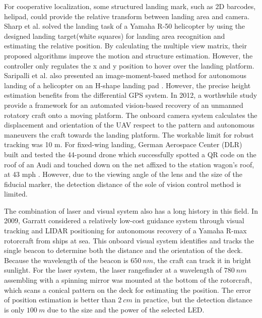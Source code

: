 For cooperative localization, some structured landing mark, such as 2D barcodes, helipad, could provide the relative transform between landing area and camera. Sharp et al. \cite{Sharp2001} solved the landing task of a Yamaha R-50 helicopter by using the designed landing target(white squares) for landing area recognition and estimating the relative position. By calculating the multiple view matrix, their proposed algorithms\cite{Shakernia2002} improve the motion and structure estimation. However, the controller only regulates the x and y position to hover over the landing platform. Saripalli et al. also presented an image-moment-based method for autonomous landing of a helicopter on an H-shape landing pad \cite{Saripalli2003}. However, the precise height estimation benefits from the differential GPS system. In 2012, a worthwhile study \cite{richardsonautomated2013} provide a framework for an automated vision-based recovery of an unmanned rotatory craft onto a moving platform. The onboard camera system calculates the displacement and orientation of the UAV respect to the pattern and autonomous maneuvers the craft towards the landing platform. The workable limit for robust tracking was 10 m. For fixed-wing landing, German Aerospace Center (DLR) built and tested the 44-pound drone which successfully spotted a QR code on the roof of an Audi and touched down on the net affixed to the station wagon’s roof, at 43 mph \cite{DLR_Landing}. However, due to the viewing angle of the lens and the size of the fiducial marker, the detection distance of the sole of vision control method is limited.



The combination of laser and visual system also has a long history in this field. In 2009, Garratt \cite{garrattvisual2009} considered a relatively low-cost guidance system through visual tracking and LIDAR positioning for autonomous recovery of a Yamaha R-max rotorcraft from ships at sea. This onboard visual system identifies and tracks the single beacon to determine both the distance and the orientation of the deck. Because the wavelength of the beacon is $650\ nm$, the craft can track it in bright sunlight. For the laser system, the laser rangefinder at a wavelength of $780\ nm$ assembling with a spinning mirror was mounted at the bottom of the rotorcraft, which scans a conical pattern on the deck for estimating the position. The error of position estimation is better than $2\ cm$ in practice, but the detection distance is only $100\ m$ due to the size and the power of the selected LED. 

